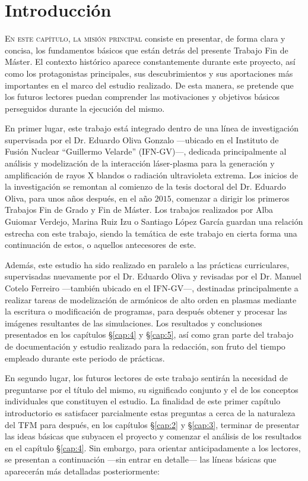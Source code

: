 \chapter{Introducción}\label{cap:1}
\lettrine{E}{n este capítulo, la misión principal} consiste en presentar, de forma clara y concisa, los fundamentos básicos que están detrás del presente Trabajo Fin de Máster. El contexto histórico aparece constantemente durante este proyecto, así como los protagonistas principales, sus descubrimientos y sus aportaciones más importantes en el marco del estudio realizado. De esta manera, se pretende que los futuros lectores puedan comprender las motivaciones y objetivos básicos perseguidos durante la ejecución del mismo.

En primer lugar, este trabajo está integrado dentro de una línea de investigación supervisada por el Dr. Eduardo Oliva Gonzalo ---ubicado en el Instituto de Fusión Nuclear \enquote{Guillermo Velarde} (IFN-GV)---, dedicada principalmente al análisis y modelización de la interacción láser-plasma para la generación y amplificación de rayos X blandos o radiación ultravioleta extrema. Los inicios de la investigación se remontan al comienzo de la tesis doctoral del Dr. Eduardo Oliva\autocite{Oliva2010a}, para unos años después, en el año $2015$, comenzar a dirigir los primeros Trabajos Fin de Grado y Fin de Máster. Los trabajos realizados por Alba Guiomar Verdejo, Marina Ruiz Izu o Santiago López García guardan una relación estrecha con este trabajo, siendo la temática de este trabajo en cierta forma una continuación de estos, o aquellos antecesores de este.

Además, este estudio ha sido realizado en paralelo a las prácticas curriculares, supervisadas nuevamente por el Dr. Eduardo Oliva y revisadas por el Dr. Manuel Cotelo Ferreiro ---también ubicado en el IFN-GV---, destinadas principalmente a realizar tareas de modelización de armónicos de alto orden en plasmas mediante la escritura o modificación de programas, para después obtener y procesar las imágenes resultantes de las simulaciones. Los resultados y conclusiones presentados en los capítulos \S\ref{cap:4} y \S\ref{cap:5}, así como gran parte del trabajo de documentación y estudio realizado para la redacción, son fruto del tiempo empleado durante este periodo de prácticas.

En segundo lugar, los futuros lectores de este trabajo sentirán la necesidad de preguntarse por el título del mismo, su significado conjunto y el de los conceptos individuales que constituyen el estudio. La finalidad de este primer capítulo introductorio es satisfacer parcialmente estas preguntas a cerca de la naturaleza del TFM para después, en los capítulos \S\ref{cap:2} y \S\ref{cap:3}, terminar de presentar las ideas básicas que subyacen el proyecto y comenzar el análisis de los resultados en el capítulo \S\ref{cap:4}. Sin embargo, para orientar anticipadamente a los lectores, se presentan a continuación ---sin entrar en detalle--- las líneas básicas que aparecerán más detalladas posteriormente:

